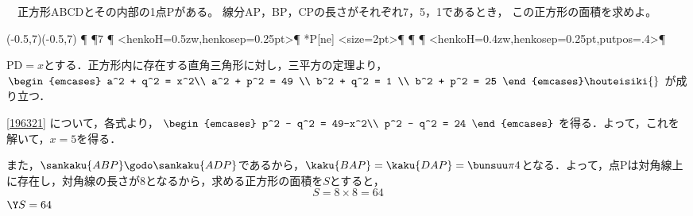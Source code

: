 \begin{problem}
  　正方形ABCDとその内部の1点Pがある。
線分AP，BP，CPの長さがそれぞれ7，5，1であるとき，
この正方形の面積を求めよ。
\end{problem}

\begin{mawarikomi}{}{%
\begin{zahyou*}[ul=8mm](-0.5,7)(-0.5,7)
  \Takakkei{\A\B\C\D}
  \CandC{}\F\P
  \Drawline{\P\A}
  \Drawline{\B\P}
  \Drawline{\C\P}
  \HenKo\A\P{$7$}
  \HenKo\P{}
  \HenKo<henkoH=0.5zw,henkosep=0.25pt>\P{}
  \tenretu**{P[ne]}
  \Kuromaru<size=2pt>\P
  \Suisen\P\A\D\Q
  \HenKo\Q{}
  \HenKo\D{}
  \Hasen{\P\Q}
  \Suisen\P\C\D\R
  \HenKo\R{}
  \HenKo\C{}
  \Hasen{\P\R}
  \Drawline{\P\D}
  \HenKo<henkoH=0.4zw,henkosep=0.25pt,putpos=.4>\P{}
\end{zahyou*}
}

$\mathrm{PD} = x$とする．正方形内に存在する直角三角形に対し，三平方の定理より，
$\begin{emcases}
  a^2 + q^2 = x^2\\
  a^2 + p^2 = 49 \\
  b^2 + q^2 = 1 \\
  b^2 + p^2 = 25
\end{emcases}\houteisiki{\label{196321}}$
が成り立つ．

\eqref{196321} について，各式より，
$\begin{emcases}
  p^2 - q^2 = 49-x^2\\
  p^2 - q^2 = 24
\end{emcases}$
を得る．よって，これを解いて，$x=5$を得る．

また，$\sankaku{ABP}\godo\sankaku{ADP}$であるから，$\kaku{BAP} = \kaku{DAP} = \bunsuu\pi4$となる．よって，点Pは対角線上に存在し，対角線の長さが8となるから，求める正方形の面積を$S$とすると，
\[S = 8 \times 8 = 64\]
\hfill$\Y S=64$

\end{mawarikomi}
